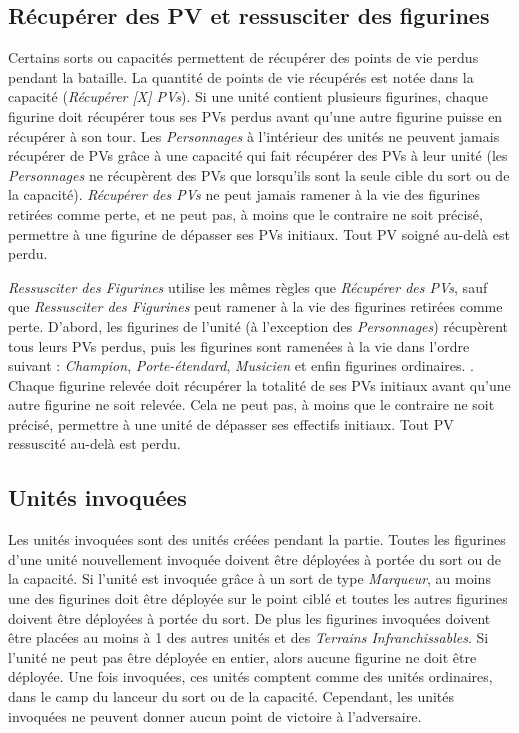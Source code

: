 \subsection{Récupérer des PV et ressusciter des figurines}

Certains sorts ou capacités permettent de récupérer des points de vie perdus pendant la bataille. La quantité de points de vie récupérés est notée dans la capacité (\emph{Récupérer [X] PVs}). Si une unité contient plusieurs figurines, chaque figurine doit récupérer tous ses PVs perdus avant qu'une autre figurine puisse en récupérer à son tour. Les \emph{Personnages} à l'intérieur des unités ne peuvent jamais récupérer de PVs grâce à une capacité qui fait récupérer des PVs à leur unité (les \emph{Personnages} ne récupèrent des PVs que lorsqu'ils sont la seule cible du sort ou de la capacité). \emph{Récupérer des PVs} ne peut jamais ramener à la vie des figurines retirées comme perte, et ne peut pas, à moins que le contraire ne soit précisé, permettre à une figurine de dépasser ses PVs initiaux. Tout PV soigné au-delà est perdu.

\emph{Ressusciter des Figurines} utilise les mêmes règles que \emph{Récupérer des PVs}, sauf que \emph{Ressusciter des Figurines} peut ramener à la vie des figurines retirées comme perte. D'abord, les figurines de l'unité (à l'exception des \emph{Personnages}) récupèrent tous leurs PVs perdus, puis les figurines sont ramenées à la vie dans l'ordre suivant : \emph{Champion}, \emph{Porte-étendard}, \emph{Musicien} et enfin figurines ordinaires. . Chaque figurine relevée doit récupérer la totalité de ses PVs initiaux avant qu'une autre figurine ne soit relevée. Cela ne peut pas, à moins que le contraire ne soit précisé, permettre à une unité de dépasser ses effectifs initiaux. Tout PV ressuscité au-delà est perdu.

\subsection{Unités invoquées}

Les unités invoquées sont des unités créées pendant la partie. Toutes les figurines d'une unité nouvellement invoquée doivent être déployées à portée du sort ou de la capacité. Si l'unité est invoquée grâce à un sort de type \emph{Marqueur}, au moins une des figurines doit être déployée sur le point ciblé et toutes les autres figurines doivent être déployées à portée du sort. De plus les figurines invoquées doivent être placées au moins à 1{\pouce} des autres unités et des \emph{Terrains Infranchissables}. 
Si l'unité ne peut pas être déployée en entier, alors aucune figurine ne doit être déployée. Une fois invoquées, ces unités comptent comme des unités ordinaires, dans le camp du lanceur du sort ou de la capacité. Cependant, les unités invoquées ne peuvent donner aucun point de victoire à l'adversaire.
